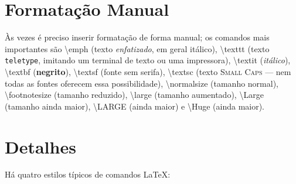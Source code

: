 \section{Formatação Manual}

Às vezes é preciso inserir formatação de forma manual; os comandos mais
importantes são \textsf{\textbackslash{}emph} (texto \emph{enfatizado}, em geral
itálico), \textsf{\textbackslash{}texttt} (texto \texttt{teletype}, imitando um
terminal de texto ou uma impressora), \textsf{\textbackslash{}textit}
(\textit{itálico}), \textsf{\textbackslash{}textbf} (\textbf{negrito}),
\textsf{\textbackslash{}textsf} (fonte \textsf{sem serifa}),
\textsf{\textbackslash{}textsc} (texto \textsc{Small Caps} --- nem todas
as fontes oferecem essa possibilidade),
\textsf{\textbackslash{}normalsize} (tamanho normal),
\textsf{\textbackslash{}footnotesize} (tamanho reduzido),
\textsf{\textbackslash{}large} (tamanho aumentado),
\textsf{\textbackslash{}Large} (tamanho ainda maior),
\textsf{\textbackslash{}LARGE} (ainda maior) e
\textsf{\textbackslash{}Huge} (ainda maior).

\section{Detalhes}

Há quatro estilos típicos de comandos \LaTeX{}:

